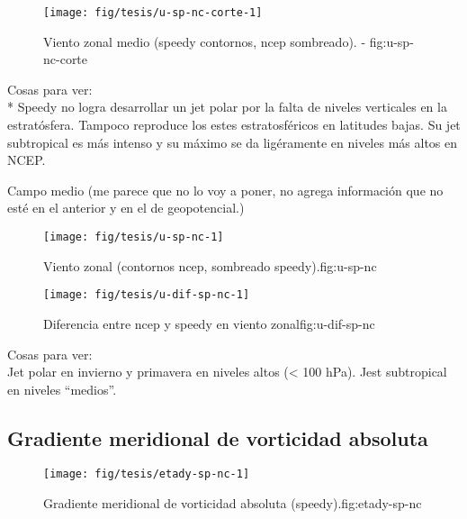 \documentclass[spanish,a4paper]{book}
\begin{document}
\begin{figure}

{\centering \texttt{[image: fig/tesis/u-sp-nc-corte-1]} 

}

\caption{Viento zonal medio (speedy contornos, ncep sombreado). - fig:u-sp-nc-corte}\label{fig:u-sp-nc-corte}
\end{figure}

Cosas para ver:\\
* Speedy no logra desarrollar un jet polar por la falta de niveles
verticales en la estratósfera. Tampoco reproduce los estes
estratosféricos en latitudes bajas. Su jet subtropical es más intenso y
su máximo se da ligéramente en niveles más altos en NCEP.

Campo medio (me parece que no lo voy a poner, no agrega información que
no esté en el anterior y en el de geopotencial.)

\begin{figure}

{\centering \texttt{[image: fig/tesis/u-sp-nc-1]} 

}

\caption{Viento zonal (contornos ncep, sombreado speedy).{fig:u-sp-nc}}\label{fig:u-sp-nc}
\end{figure}

\begin{figure}
\texttt{[image: fig/tesis/u-dif-sp-nc-1]} \caption{Diferencia entre ncep y speedy en viento zonal{fig:u-dif-sp-nc}}\label{fig:u-dif-sp-nc}
\end{figure}

Cosas para ver:\\
Jet polar en invierno y primavera en niveles altos (\textless{} 100
hPa). Jest subtropical en niveles ``medios''.

\subsection{Gradiente meridional de vorticidad
absoluta}\label{gradiente-meridional-de-vorticidad-absoluta-1}

\begin{figure}

{\centering \texttt{[image: fig/tesis/etady-sp-nc-1]} 

}

\caption{Gradiente meridional de vorticidad absoluta (speedy).{fig:etady-sp-nc}}\label{fig:etady-sp-nc}
\end{figure}
\end{document}
